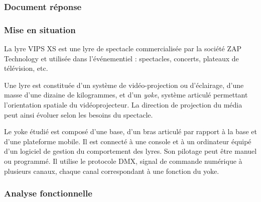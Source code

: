 
\subsubsection*{Document réponse}


\subsubsection*{Mise en situation}

La lyre VIPS XS est une lyre de spectacle commercialisée par la société ZAP
Technology et utilisée dans l'événementiel : spectacles, concerts, plateaux de
télévision, etc.

Une lyre est constituée d'un système de vidéo-projection ou d'éclairage, d'une
masse d'une dizaine de kilogrammes, et d'un \emph{yoke}, système articulé
permettant l'orientation spatiale du vidéoprojecteur. La direction de projection
du média peut ainsi évoluer selon les besoins du spectacle.

Le yoke étudié est composé d'une base, d'un bras articulé par rapport à la base
et d'une plateforme mobile. Il est connecté à une console et à un ordinateur
équipé d'un logiciel de gestion du comportement des lyres. Son pilotage peut
être manuel ou programmé. Il utilise le protocole DMX, signal de commande
numérique à plusieurs canaux, chaque canal correspondant à une fonction du
yoke.


\subsubsection*{Analyse fonctionnelle}

